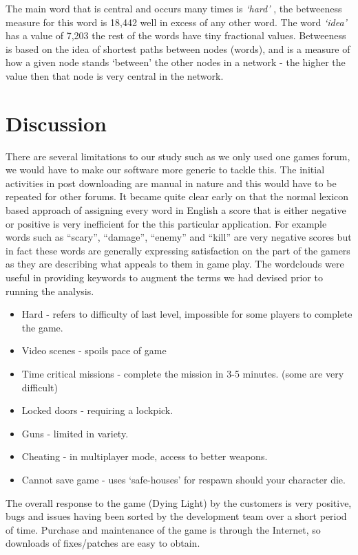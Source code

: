 \documentclass{ewic}
\begin{document}
The main word that is central and occurs many times is {\it `hard' }, the betweeness measure for this word is 18,442 well in excess of any other word. The word {\it `idea'} has a value of 7,203 the rest of the words have tiny fractional values. Betweeness is based on the idea of shortest paths between nodes (words), and is a measure of how a given node stands `between' the other nodes in a network - the higher the value then that node is very central in the network.


\section{Discussion}
There are several limitations to our study such as we only used one games forum, we would have to make our software more generic to tackle this. The initial activities in post downloading are manual in nature and this would have to be repeated for other forums. It became quite clear early on that the normal lexicon based approach of assigning every word in English a score that is either negative or positive is very inefficient for the this particular application. For example words such as ``scary'', ``damage'', ``enemy'' and ``kill'' are very negative scores but in fact these words are generally expressing satisfaction on the part of the gamers as they are describing what appeals to them in game play. The wordclouds were useful in providing keywords to augment the terms we had devised prior to running the analysis. 

\begin{itemize}
\item Hard - refers to difficulty of last level, impossible for some players to complete the game.
\item Video scenes - spoils pace of game
\item Time critical missions - complete the mission in 3-5 minutes. (some are very difficult)
\item Locked doors - requiring a lockpick.
\item Guns - limited in variety.
\item Cheating - in multiplayer mode, access to better weapons.
\item Cannot save game - uses `safe-houses' for respawn should your character die.
\end{itemize}

The overall response to the game (Dying Light) by the customers is very positive, bugs and issues having been sorted by the development team over a short period of time. Purchase and maintenance of the game is through the Internet, so downloads of fixes/patches are easy to obtain.
\end{document}
